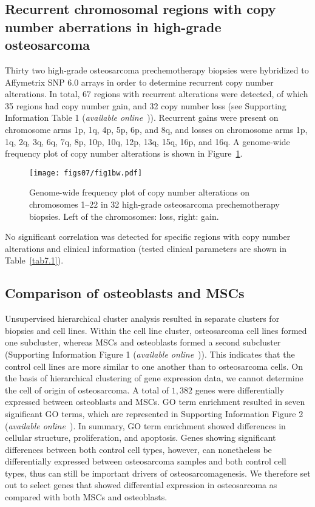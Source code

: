 \subsection{Recurrent chromosomal regions with copy number aberrations in high\hyp{}grade osteosarcoma}
Thirty two high\hyp{}grade osteosarcoma prechemotherapy
biopsies were hybridized to Af\-fy\-met\-rix
SNP 6.0 arrays in order to determine recurrent
copy number alterations. In total, 67 regions with
recurrent alterations were detected, of which 35
regions had copy number gain, and 32 copy number
loss (see Supporting Information Table 1 ({\it available online}~\cite{ch7additional})).
Recurrent gains were present on chromosome
arms 1p, 1q, 4p, 5p, 6p, and 8q, and losses on
chromosome arms 1p, 1q, 2q, 3q, 6q, 7q, 8p, 10p,
10q, 12p, 13q, 15q, 16p, and 16q. A genome\hyp{}wide
frequency plot of copy number alterations is
shown in Figure~\ref{fig7.1}.
%
\begin{figure}[htbp]
	\centering
	\texttt{[image: figs07/fig1bw.pdf]}	%
	\caption{Genome\hyp{}wide frequency plot of copy number alterations on chromosomes 1--22 in 32 high\hyp{}grade osteosarcoma prechemotherapy biopsies. Left of the chromosomes: loss, right: gain.}
	\label{fig7.1}
\end{figure}
%
No significant correlation was
detected for specific regions with copy number
alterations and clinical information (tested clinical
parameters are shown in Table~\ref{tab7.1}).

\subsection{Comparison of osteoblasts and MSCs}
Unsupervised hierarchical cluster analysis
resulted in separate clusters for biopsies and cell
lines. Within the cell line cluster, osteosarcoma
cell lines formed one subcluster, whereas MSCs
and osteoblasts formed a second subcluster (Supporting
Information Figure 1 ({\it available online}~\cite{ch7additional})). This indicates that
the control cell lines are more similar to one
another than to osteosarcoma cells. On the basis
of hierarchical clustering of gene expression data,
we cannot determine the cell of origin of osteosarcoma.
A total of $1,382$ genes were differentially
expressed between osteoblasts and MSCs. GO
term enrichment resulted in seven significant GO
terms, which are represented in Supporting Information
Figure 2 ({\it available online}~\cite{ch7additional}). In summary, GO term enrichment
showed differences in cellular structure,
proliferation, and apoptosis. Genes showing significant
differences between both control cell
types, however, can nonetheless be differentially
expressed between osteosarcoma samples and
both control cell types, thus can still be important
drivers of osteosarcomagenesis. We therefore set
out to select genes that showed differential
expression in osteosarcoma as compared with
both MSCs and osteoblasts.

